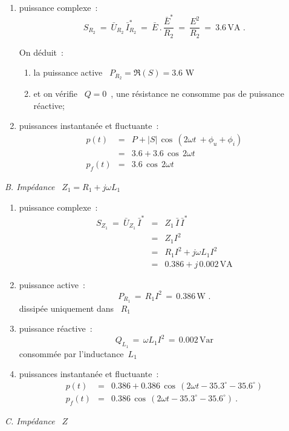 \begin{enumerate}
	\item puissance complexe~:
	\[ S_{R_2} \: = \: \bar{U}_{R_2} \, \bar{I}_{R_2}^{\ast} \: = \: \bar{E} \, . \, 
	\dfrac{\bar{E}^{\ast}}{R_2} \: =\: \dfrac{E^2}{R_2} \: = \: 3.6\, \text{VA~.} \]
	
	On déduit~:
	\begin{enumerate}
		\item la puissance active \ $P_{R_2} = \Re(S) = 3.6$ W
		\item et on vérifie \ $Q=0$~, une résistance ne consomme pas de puissance réactive;
	\end{enumerate}
	\item puissances instantanée et fluctuante~:
	\begin{eqnarray*}
		p(t) &=& P + |S|\, \cos\, (2\omega t \ + \phi_u + \phi_i )\\
		&=& 3.6 + 3.6 \, \cos \, 2\omega t \\
		p_f(t) &=& 3.6 \, \cos \, 2\omega t 
	\end{eqnarray*}
\end{enumerate}
{\em B.  Impédance} \ $Z_1 = R_1 + j\omega L_1$
\begin{enumerate}
	\item puissance complexe~:
	\begin{eqnarray*}
		S_{Z_1} \: = \: \bar{U}_{Z_1} \, \bar{I}^{\ast} &=& Z_1 \, \bar{I} \, \bar{I}^{\ast}\\&=& Z_1 I^2\\
		&=& R_1 I^2 + j\omega L_1I^2\\
		&=& 0.386 + j\, 0.002 \, \text{VA} 
	\end{eqnarray*}
	\item puissance active~:
	\[ P_{R_1} \, = \, R_1 I^2 \, = \, 0.386\, \text{W~.} \]
	dissipée uniquement dans \, $R_1$
	\item puissance réactive~:
	\[ Q_{L_1} \, = \, \omega L_1 I^2 \, = \, 0.002\, \text{Var} \]
	consommée par l'inductance\ $L_1~$
	\item puissances instantanée et fluctuante~:
	\begin{eqnarray*}
		p(t) &=& 0.386 + 0.386 \, \cos \, (2\omega t - 35.3^{\circ} - 35.6^{\circ})\\
		p_f(t) &=& 0.386 \, \cos \, (2\omega t - 35.3^{\circ} - 35.6^{\circ})~.
	\end{eqnarray*}
\end{enumerate}

{\em C.  Impédance} \ $Z$

